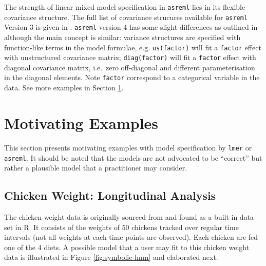 \documentclass[runningheads]{llncs}
\begin{document}
The strength of linear mixed model specification in \texttt{asreml} lies in its flexible covariance structure. The full list of covariance strucures available for \texttt{asreml} Version 3 is given in \textcite{Butler2009}. \texttt{asreml} version 4 has some slight differences as outlined in \textcite{Butler2018} although the main concept is similar: variance structures are specified with function-like terms in the model formulae, e.g. \texttt{us(factor)} will fit a \texttt{factor} effect with unstructured covariance matrix; \texttt{diag(factor)} will fit a \texttt{factor} effect with diagonal covariance matrix, i.e.~zero off-diagonal and different parameterisation in the diagonal elements. Note \texttt{factor} correspond to a categorical variable in the data. See more examples in Section \ref{examples}.

\hypertarget{examples}{%
\section{Motivating Examples}\label{examples}}

This section presents motivating examples with model specification by \texttt{lmer} or \texttt{asreml}. It should be noted that the models are not advocated to be ``correct'' but rather a plausible model that a practitioner may consider.

\hypertarget{chick}{%
\subsection{Chicken Weight: Longitudinal Analysis}\label{chick}}

The chicken weight data is originally sourced from \textcite{chickendata} and found as a built-in data set in R. It consists of the weights of 50 chickens tracked over regular time intervals (not all weights at each time points are observed). Each chicken are fed one of the 4 diets. A possible model that a user may fit to this chicken weight data is illustrated in Figure \ref{fig:symbolic-lmm} and elaborated next.
\end{document}
